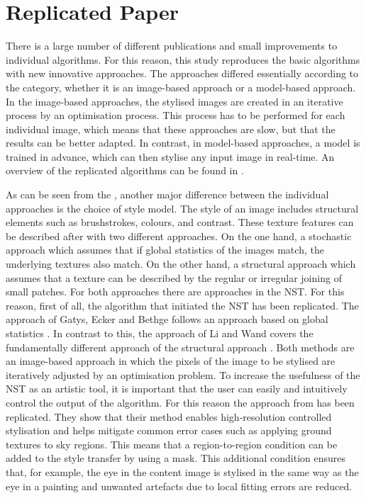 \section{Replicated Paper} \label{sec:replicated_paper}

There is a large number of different publications and small improvements to individual algorithms. For this reason, this study reproduces the basic algorithms with new innovative approaches. The approaches differed essentially according to the category, whether it is an image-based approach or a model-based approach. In the image-based approaches, the stylised images are created in an iterative process by an optimisation process. This process has to be performed for each individual image, which means that these approaches are slow, but that the results can be better adapted. In contrast, in model-based approaches, a model is trained in advance, which can then stylise any input image in real-time. An overview of the replicated algorithms can be found in . 

As can be seen from the , another major difference between the individual approaches is the choice of style model. The style of an image includes structural elements such as brushstrokes, colours, and contrast. These texture features can be described after \cite{Zho2006} with two different approaches. On the one hand, a stochastic approach which assumes that if global statistics of the images match, the underlying textures also match. On the other hand, a structural approach which assumes that a texture can be described by the regular or irregular joining of small patches. For both approaches there are approaches in the NST. For this reason, first of all, the algorithm that initiated the NST has been replicated. The approach of Gatys, Ecker and Bethge follows an approach based on global statistics \cite{GEB2016}. In contrast to this, the approach of Li and Wand covers the fundamentally different approach of the structural approach \cite{LW2016}. Both methods are an image-based approach in which the pixels of the image to be stylised are iteratively adjusted by an optimisation problem. To increase the usefulness of the NST as an artistic tool, it is important that the user can easily and intuitively control the output of the algorithm. For this reason the approach from \cite{GEB+2017} has been replicated. They show that their method enables high-resolution controlled stylisation and helps mitigate common error cases such as applying ground textures to sky regions. This means that a region-to-region condition can be added to the style transfer by using a mask. This additional condition ensures that, for example, the eye in the content image is stylised in the same way as the eye in a painting and unwanted artefacts due to local fitting errors are reduced.

